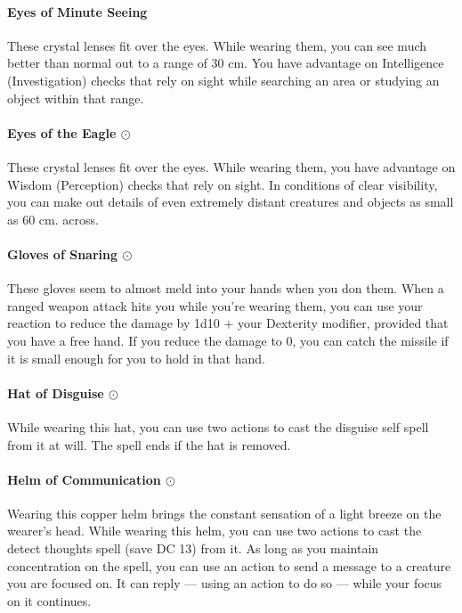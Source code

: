     \paragraph{Eyes of Minute Seeing}
        These crystal lenses fit over the eyes.
        While wearing them, you can see much better than normal out to a range of 30 cm.
        You have advantage on Intelligence (Investigation) checks that rely on sight while searching an area or studying an object within that range.
    \paragraph{Eyes of the Eagle $\odot$}
        These crystal lenses fit over the eyes.
        While wearing them, you have advantage on Wisdom (Perception) checks that rely on sight.
        In conditions of clear visibility, you can make out details of even extremely distant creatures and objects as small as 60 cm. across.
    \paragraph{Gloves of Snaring $\odot$}
        These gloves seem to almost meld into your hands when you don them.
        When a ranged weapon attack hits you while you're wearing them, you can use your reaction to reduce the damage by 1d10 + your Dexterity modifier, provided that you have a free hand.
        If you reduce the damage to 0, you can catch the missile if it is small enough for you to hold in that hand.
    \paragraph{Hat of Disguise $\odot$}
        While wearing this hat, you can use two actions to cast the disguise self spell from it at will.
        The spell ends if the hat is removed.
    \paragraph{Helm of Communication $\odot$}
        Wearing this copper helm brings the constant sensation of a light breeze on the wearer's head.
        While wearing this helm, you can use two actions to cast the detect thoughts spell (save DC 13) from it.
        As long as you maintain concentration on the spell, you can use an action to send a message to a creature you are focused on.
        It can reply --- using an action to do so --- while your focus on it continues.


